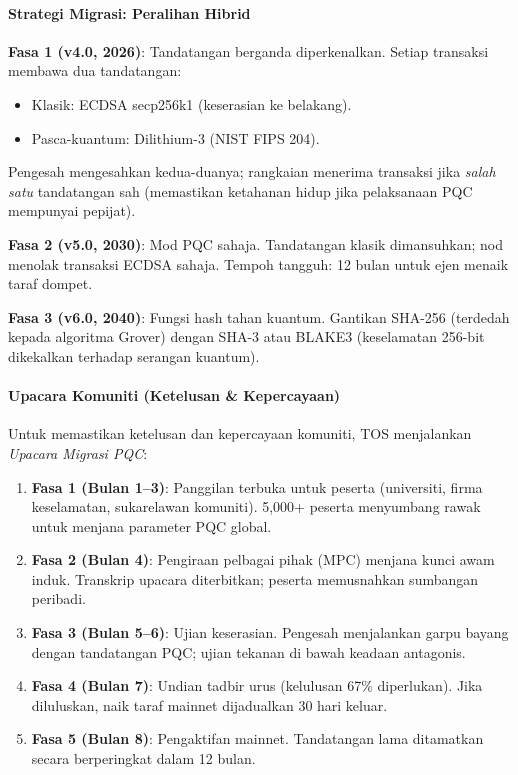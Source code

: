 \documentclass[11pt]{article}
\begin{document}
\paragraph{Strategi Migrasi: Peralihan Hibrid}
\textbf{Fasa 1 (v4.0, 2026)}: Tandatangan berganda diperkenalkan. Setiap transaksi membawa dua tandatangan:
\begin{itemize}[noitemsep]
  \item Klasik: ECDSA secp256k1 (keserasian ke belakang).
  \item Pasca-kuantum: Dilithium-3 (NIST FIPS 204).
\end{itemize}
Pengesah mengesahkan kedua-duanya; rangkaian menerima transaksi jika \emph{salah satu} tandatangan sah (memastikan ketahanan hidup jika pelaksanaan PQC mempunyai pepijat).

\textbf{Fasa 2 (v5.0, 2030)}: Mod PQC sahaja. Tandatangan klasik dimansuhkan; nod menolak transaksi ECDSA sahaja. Tempoh tangguh: 12 bulan untuk ejen menaik taraf dompet.

\textbf{Fasa 3 (v6.0, 2040)}: Fungsi hash tahan kuantum. Gantikan SHA-256 (terdedah kepada algoritma Grover) dengan SHA-3 atau BLAKE3 (keselamatan 256-bit dikekalkan terhadap serangan kuantum).

\paragraph{Upacara Komuniti (Ketelusan \& Kepercayaan)}
Untuk memastikan ketelusan dan kepercayaan komuniti, TOS menjalankan \emph{Upacara Migrasi PQC}:
\begin{enumerate}[noitemsep]
  \item \textbf{Fasa 1 (Bulan 1--3)}: Panggilan terbuka untuk peserta (universiti, firma keselamatan, sukarelawan komuniti). 5,000+ peserta menyumbang rawak untuk menjana parameter PQC global.
  \item \textbf{Fasa 2 (Bulan 4)}: Pengiraan pelbagai pihak (MPC) menjana kunci awam induk. Transkrip upacara diterbitkan; peserta memusnahkan sumbangan peribadi.
  \item \textbf{Fasa 3 (Bulan 5--6)}: Ujian keserasian. Pengesah menjalankan garpu bayang dengan tandatangan PQC; ujian tekanan di bawah keadaan antagonis.
  \item \textbf{Fasa 4 (Bulan 7)}: Undian tadbir urus (kelulusan 67\% diperlukan). Jika diluluskan, naik taraf mainnet dijadualkan 30 hari keluar.
  \item \textbf{Fasa 5 (Bulan 8)}: Pengaktifan mainnet. Tandatangan lama ditamatkan secara berperingkat dalam 12 bulan.
\end{enumerate}
\end{document}

